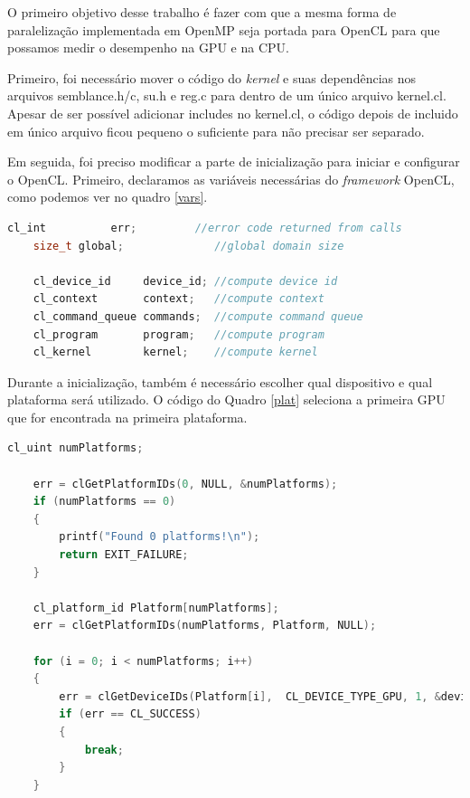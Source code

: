\documentclass[12pt]{article}
\begin{document}
O primeiro objetivo desse trabalho é fazer com que a mesma forma de paralelização implementada em OpenMP seja portada para OpenCL para que possamos medir o desempenho na GPU e na CPU. 

Primeiro, foi necessário mover o código do \textit{kernel} e suas dependências nos arquivos semblance.h/c, su.h e reg.c para dentro de um único arquivo kernel.cl. Apesar de ser possível adicionar includes no kernel.cl, o código depois de incluido em único arquivo ficou pequeno o suficiente para não precisar ser separado.

Em seguida, foi preciso modificar a parte de inicialização para iniciar e configurar o OpenCL. Primeiro, declaramos as variáveis necessárias do \textit{framework} OpenCL, como podemos ver no quadro \ref{vars}.\\

\begin{lstlisting}[language=c, caption=Declaração das variáveis OpenCL., label=vars]
    cl_int          err;         //error code returned from calls
    size_t global;              //global domain size

    cl_device_id     device_id; //compute device id
    cl_context       context;   //compute context
    cl_command_queue commands;  //compute command queue
    cl_program       program;   //compute program
    cl_kernel        kernel;    //compute kernel
\end{lstlisting}

Durante a inicialização, também é necessário escolher qual dispositivo e qual plataforma será utilizado. O código do Quadro \ref{plat} seleciona a primeira GPU que for encontrada na primeira plataforma.\\

\begin{lstlisting}[language=c, caption=Selecionando a plataforma e o dispositivo OpenCL., label=plat]
    cl_uint numPlatforms;

    err = clGetPlatformIDs(0, NULL, &numPlatforms);
    if (numPlatforms == 0)
    {
        printf("Found 0 platforms!\n");
        return EXIT_FAILURE;
    }

    cl_platform_id Platform[numPlatforms];
    err = clGetPlatformIDs(numPlatforms, Platform, NULL);

    for (i = 0; i < numPlatforms; i++)
    {
        err = clGetDeviceIDs(Platform[i],  CL_DEVICE_TYPE_GPU, 1, &device_id, NULL);
        if (err == CL_SUCCESS)
        {
            break;
        }
    }
\end{lstlisting}
\end{document}
